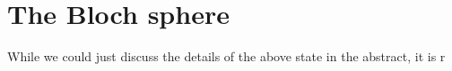 \section{The Bloch sphere}

While we could just discuss the details of the above state in the abstract, it is r